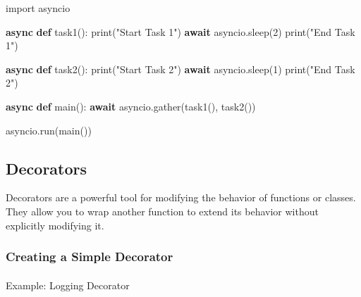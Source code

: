 \documentclass[
  letterpaper,
  DIV=11,
  numbers=noendperiod]{scrreprt}
\makeatletter
\let\oldparagraph\paragraph
\renewcommand{\paragraph}{
    \@ifstar
      \xxxParagraphStar
      \xxxParagraphNoStar
  }
\newcommand{\xxxParagraphStar}[1]{\oldparagraph*{#1}\mbox{}}
\newcommand{\xxxParagraphNoStar}[1]{\oldparagraph{#1}\mbox{}}
\newenvironment{Shaded}{\begin{snugshade}}{\end{snugshade}}
\newcommand{\BuiltInTok}[1]{\textcolor[rgb]{0.00,0.23,0.31}{#1}}
\newcommand{\ControlFlowTok}[1]{\textcolor[rgb]{0.00,0.23,0.31}{\textbf{#1}}}
\newcommand{\DecValTok}[1]{\textcolor[rgb]{0.68,0.00,0.00}{#1}}
\newcommand{\ImportTok}[1]{\textcolor[rgb]{0.00,0.46,0.62}{#1}}
\newcommand{\KeywordTok}[1]{\textcolor[rgb]{0.00,0.23,0.31}{\textbf{#1}}}
\newcommand{\NormalTok}[1]{\textcolor[rgb]{0.00,0.23,0.31}{#1}}
\newcommand{\StringTok}[1]{\textcolor[rgb]{0.13,0.47,0.30}{#1}}
\makeatother
\begin{document}
\begin{Shaded}
\begin{Highlighting}[]
\ImportTok{import}\NormalTok{ asyncio}

\ControlFlowTok{async} \KeywordTok{def}\NormalTok{ task1():}
    \BuiltInTok{print}\NormalTok{(}\StringTok{"Start Task 1"}\NormalTok{)}
    \ControlFlowTok{await}\NormalTok{ asyncio.sleep(}\DecValTok{2}\NormalTok{)}
    \BuiltInTok{print}\NormalTok{(}\StringTok{"End Task 1"}\NormalTok{)}

\ControlFlowTok{async} \KeywordTok{def}\NormalTok{ task2():}
    \BuiltInTok{print}\NormalTok{(}\StringTok{"Start Task 2"}\NormalTok{)}
    \ControlFlowTok{await}\NormalTok{ asyncio.sleep(}\DecValTok{1}\NormalTok{)}
    \BuiltInTok{print}\NormalTok{(}\StringTok{"End Task 2"}\NormalTok{)}

\ControlFlowTok{async} \KeywordTok{def}\NormalTok{ main():}
    \ControlFlowTok{await}\NormalTok{ asyncio.gather(task1(), task2())}

\NormalTok{asyncio.run(main())}
\end{Highlighting}
\end{Shaded}

\subsection{Decorators}\label{decorators-1}

Decorators are a powerful tool for modifying the behavior of functions
or classes. They allow you to wrap another function to extend its
behavior without explicitly modifying it.

\subsubsection{Creating a Simple
Decorator}\label{creating-a-simple-decorator}

\paragraph{Example: Logging Decorator}\label{example-logging-decorator}
\end{document}
